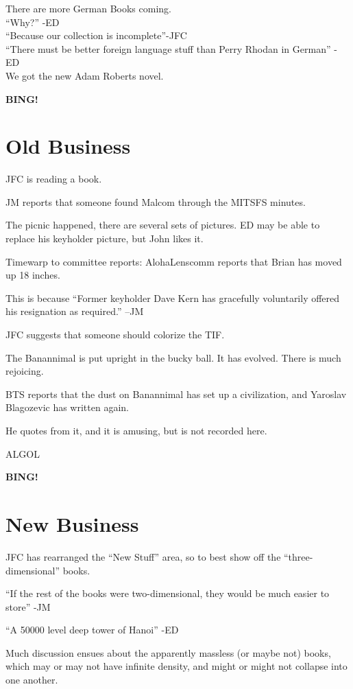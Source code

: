 \documentclass[10pt]{article}
\newcommand{\bing}{{\bf BING!} }
\begin{document}
There are more German Books coming.\\
``Why?'' -ED\\
``Because our collection is incomplete''-JFC\\
``There must be better foreign language stuff than Perry Rhodan in
German'' -ED\\


We got the new Adam Roberts novel.

\bing

\section*{Old Business}
JFC is reading a book.

JM reports that someone found Malcom through the MITSFS minutes.

The picnic happened, there are several sets of pictures.
ED may be able to replace his keyholder picture, but John likes it.

Timewarp to committee reports: AlohaLenscomm reports that Brian has
moved up 18 inches.

This is because ``Former keyholder Dave Kern has
gracefully voluntarily offered his resignation as required.'' --JM

JFC suggests that someone should colorize the TIF.

The Banannimal is put upright in the bucky ball. It has
evolved. There is much rejoicing.

BTS reports that the dust on Banannimal has set up a civilization, and 
Yaroslav Blagozevic has written again.  

He quotes from it, and it is amusing, but is not recorded here.

ALGOL

\bing

\section*{New Business}
JFC has rearranged the ``New Stuff'' area, so to best show off the 
``three-dimensional'' books.
 
``If the rest of the books were two-dimensional, they would be much
easier to store'' -JM

``A 50000 level deep tower of Hanoi'' -ED

Much discussion ensues about the apparently massless (or maybe not)
books, which may or may not have infinite density, and might or might
not collapse into one another.
\end{document}
